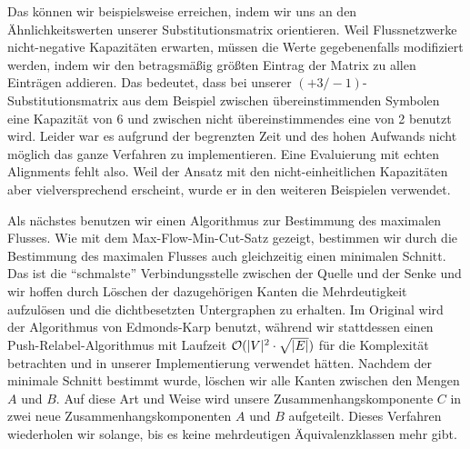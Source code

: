 Das können wir beispielsweise erreichen, indem wir uns an den Ähnlichkeitswerten unserer Substitutionsmatrix orientieren. Weil Flussnetzwerke nicht-negative Kapazitäten erwarten, müssen die Werte gegebenenfalls modifiziert werden, indem wir den betragsmäßig größten Eintrag der Matrix zu allen Einträgen addieren. Das bedeutet, dass bei unserer $(+3/-1)$-Substitutionsmatrix aus dem Beispiel zwischen übereinstimmenden Symbolen eine Kapazität von 6 und zwischen nicht übereinstimmendes eine von 2 benutzt wird. Leider war es aufgrund der begrenzten Zeit und des hohen Aufwands nicht möglich das ganze Verfahren zu implementieren. Eine Evaluierung mit echten Alignments fehlt also. Weil der Ansatz mit den nicht-einheitlichen Kapazitäten aber vielversprechend erscheint, wurde er in den weiteren Beispielen verwendet.

Als nächstes benutzen wir einen Algorithmus zur Bestimmung des maximalen Flusses. Wie mit dem Max-Flow-Min-Cut-Satz gezeigt, bestimmen wir durch die Bestimmung des maximalen Flusses auch gleichzeitig einen minimalen Schnitt. Das ist die \enquote{schmalste} Verbindungsstelle zwischen der Quelle und der Senke und wir hoffen durch Löschen der dazugehörigen Kanten die Mehrdeutigkeit aufzulösen und die dichtbesetzten Untergraphen zu erhalten. Im Original wird der Algorithmus von Edmonds-Karp benutzt, während wir stattdessen einen Push-Relabel-Algorithmus mit Laufzeit $\mathcal{O}(|V|^2\cdot \sqrt{|E|})$ für die Komplexität betrachten und in unserer Implementierung verwendet hätten. Nachdem der minimale Schnitt bestimmt wurde, löschen wir alle Kanten zwischen den Mengen $A$ und $B$. Auf diese Art und Weise wird unsere Zusammenhangskomponente $C$ in zwei neue Zusammenhangskomponenten $A$ und $B$ aufgeteilt. Dieses Verfahren wiederholen wir solange, bis es keine mehrdeutigen Äquivalenzklassen mehr gibt.  


